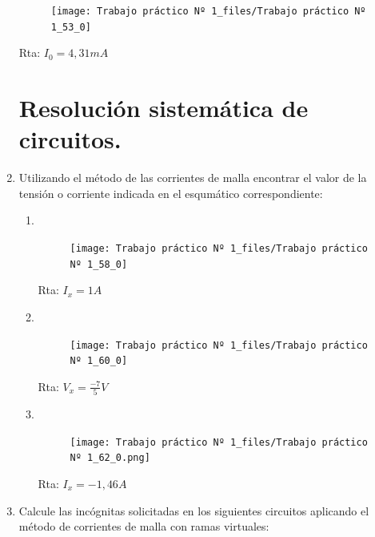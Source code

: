 \documentclass[10pt,a4paper]{article}
\begin{document}
\begin{enumerate}
	\begin{figure}[H]
	\centering
	\texttt{[image: Trabajo práctico Nº 1\_files/Trabajo práctico Nº 1\_53\_0]}
	\label{e12}
\end{figure}


Rta: $I_0=4,31mA$

\section*{Resolución sistemática de circuitos.}

\item Utilizando el método de las corrientes de malla encontrar el valor de la tensión o corriente indicada en el esqumático correspondiente:

\begin{enumerate}
	
	\item \
	
	\begin{figure}[H]
		\centering
		\texttt{[image: Trabajo práctico Nº 1\_files/Trabajo práctico Nº 1\_58\_0]}
		\label{e13a}
	\end{figure}
	
	Rta: $I_x=1A$
	
	\item \
	
	\begin{figure}[H]
		\centering
		\texttt{[image: Trabajo práctico Nº 1\_files/Trabajo práctico Nº 1\_60\_0]}
		\label{e13b}
	\end{figure}
	
	Rta: $V_x=\frac{-7}{5} V$
	
	\item \
	
	\begin{figure}[H]
		\centering
		\texttt{[image: Trabajo práctico Nº 1\_files/Trabajo práctico Nº 1\_62\_0.png]}
		\label{e13c}
	\end{figure}
	Rta: $I_x=-1,46A$

\end{enumerate}

\item Calcule las incógnitas solicitadas en los siguientes circuitos aplicando el método de corrientes de malla con ramas virtuales:


\end{enumerate}
\end{document}
